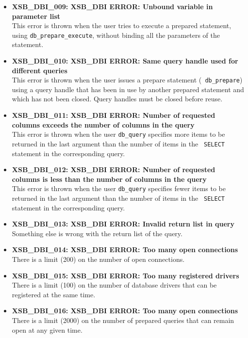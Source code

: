 \begin{itemize}
\item {\bf XSB\_DBI\_009: XSB\_DBI ERROR: Unbound variable in parameter list}\\
This error is thrown when the user tries to execute a prepared statement,
using {\tt db\_prepare\_execute}, without binding all the parameters of the
statement.

\item {\bf XSB\_DBI\_010: XSB\_DBI ERROR: Same query handle used for
    different queries}\\
  This error is thrown when the user issues a prepare statement ({\tt
    db\_prepare})  using a query
  handle that has been in use by another prepared statement and which has
  not been closed. Query handles must be closed before reuse.
\item {\bf XSB\_DBI\_011: XSB\_DBI ERROR: Number of requested columns exceeds the number of columns in the query}\\
  This error is thrown when the user {\tt db\_query}  specifies more items to be
  returned in the last argument than the number of items in the {\tt
    SELECT} statement in the corresponding query.
\item {\bf XSB\_DBI\_012: XSB\_DBI ERROR: Number of requested columns is less than the number of columns in the query}\\
  This error is thrown when the user {\tt db\_query}  specifies fewer items to be
  returned in the last argument than the number of items in the {\tt
    SELECT} statement in the corresponding query.
\item {\bf XSB\_DBI\_013: XSB\_DBI ERROR: Invalid return list in query}\\
  Something else is wrong with the return list of the query.
\item {\bf XSB\_DBI\_014: XSB\_DBI ERROR: Too many open connections}\\
  There is a limit (200) on the number of open connections.
\item {\bf XSB\_DBI\_015: XSB\_DBI ERROR: Too many registered drivers}\\
  There is a limit (100) on the number of database drivers that can be
  registered at the same time.
\item {\bf XSB\_DBI\_016: XSB\_DBI ERROR: Too many open connections}\\
  There is a limit (2000) on the number of prepared queries that can remain
  open at any given time.
\end{itemize}

